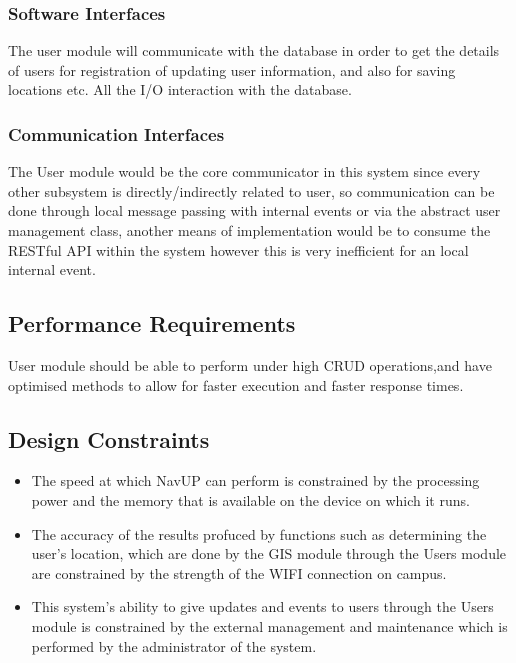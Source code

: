 	\subsubsection{Software Interfaces } 
	The user module will communicate with the database in order to get the details of users for registration of updating user information, and also for saving locations etc. All the I/O interaction with the database.
	\subsubsection{Communication Interfaces } 

	The User module would be the core communicator in this system since every other subsystem is directly/indirectly related to user, so communication can be done through local message passing with internal events or via the abstract user management class, another means of implementation would be to consume the RESTful API within the system however this is very inefficient for an local internal event.



	
\subsection{Performance Requirements} %
User module should be able to perform under high CRUD operations,and have optimised methods to allow for faster execution and faster response times.


\subsection{Design Constraints}
\begin{itemize}

\item The speed at which NavUP can perform is constrained by the processing power and the  memory that is available on the device on which it runs.

\item The accuracy of the results profuced by functions such as determining the user's location, which are done by the GIS module through the Users module are constrained by the strength of the WIFI connection on campus.

\item This system’s ability to give updates and events to users through the Users module is constrained by the external management and maintenance which is performed by the administrator of the system.

\end{itemize}


